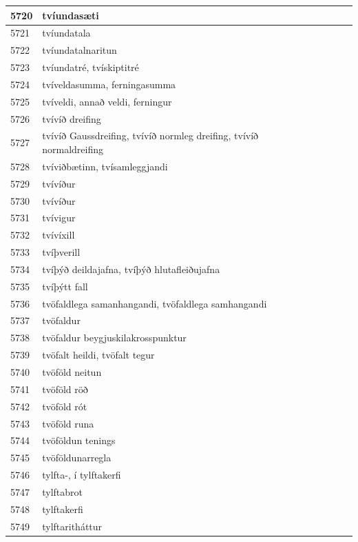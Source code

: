 \begin{longtable}{p{}|p{}|p{}|p{}|p{}}
\hline
5720 & tvíundasæti &  &  &  \\
\hline
5721 & tvíundatala &  &  &  \\
\hline
5722 & tvíundatalnaritun &  &  &  \\
\hline
5723 & tvíundatré, tvískiptitré &  &  &  \\
\hline
5724 & tvíveldasumma, ferningasumma &  &  &  \\
\hline
5725 & tvíveldi, annað veldi, ferningur &  &  &  \\
\hline
5726 & tvívíð dreifing &  &  &  \\
\hline
5727 & tvívíð Gaussdreifing, tvívíð normleg dreifing, tvívíð normaldreifing &  &  &  \\
\hline
5728 & tvíviðbætinn, tvísamleggjandi &  &  &  \\
\hline
5729 & tvívíður &  &  &  \\
\hline
5730 & tvívíður &  &  &  \\
\hline
5731 & tvívigur &  &  &  \\
\hline
5732 & tvívíxill &  &  &  \\
\hline
5733 & tvíþverill &  &  &  \\
\hline
5734 & tvíþýð deildajafna, tvíþýð hlutafleiðujafna &  &  &  \\
\hline
5735 & tvíþýtt fall &  &  &  \\
\hline
5736 & tvöfaldlega samanhangandi, tvöfaldlega samhangandi &  &  &  \\
\hline
5737 & tvöfaldur &  &  &  \\
\hline
5738 & tvöfaldur beygjuskilakrosspunktur &  &  &  \\
\hline
5739 & tvöfalt heildi, tvöfalt tegur &  &  &  \\
\hline
5740 & tvöföld neitun &  &  &  \\
\hline
5741 & tvöföld röð &  &  &  \\
\hline
5742 & tvöföld rót &  &  &  \\
\hline
5743 & tvöföld runa &  &  &  \\
\hline
5744 & tvöföldun tenings &  &  &  \\
\hline
5745 & tvöföldunarregla &  &  &  \\
\hline
5746 & tylfta-, í tylftakerfi &  &  &  \\
\hline
5747 & tylftabrot &  &  &  \\
\hline
5748 & tylftakerfi &  &  &  \\
\hline
5749 & tylftaritháttur &  &  &  \\

\end{longtable}
